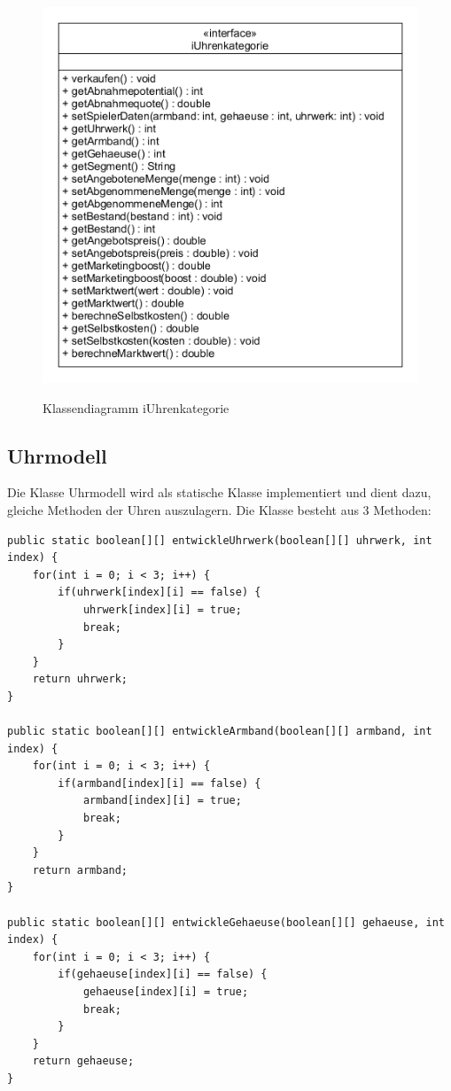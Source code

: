\begin{figure}[!h]
	\centering
	\includegraphics[scale=0.7]{img/iUhrenkategorie.png} 
	\label{fig:iUhren}
	\caption{Klassendiagramm iUhrenkategorie}
\end{figure}

\subsection{Uhrmodell}
Die Klasse Uhrmodell wird als statische Klasse implementiert und dient dazu, gleiche Methoden der Uhren auszulagern. Die Klasse besteht aus 3 Methoden: 
\lstset{language=Java}
\begin{lstlisting}
public static boolean[][] entwickleUhrwerk(boolean[][] uhrwerk, int index) {
	for(int i = 0; i < 3; i++) {
		if(uhrwerk[index][i] == false) {
			uhrwerk[index][i] = true;
			break;
		}
	}
	return uhrwerk;
}

public static boolean[][] entwickleArmband(boolean[][] armband, int index) {
	for(int i = 0; i < 3; i++) {
		if(armband[index][i] == false) {
			armband[index][i] = true;
			break;
		}
	}
	return armband;
}

public static boolean[][] entwickleGehaeuse(boolean[][] gehaeuse, int index) {
	for(int i = 0; i < 3; i++) {
		if(gehaeuse[index][i] == false) {
			gehaeuse[index][i] = true;
			break;
		}
	}
	return gehaeuse;
}	
\end{lstlisting}

